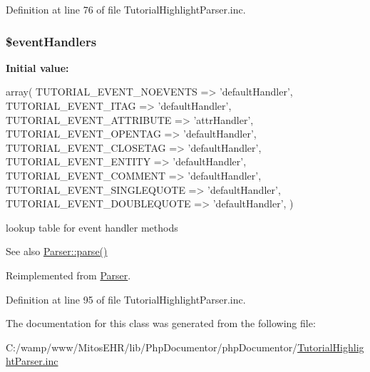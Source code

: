 \-Definition at line 76 of file \-Tutorial\-Highlight\-Parser.\-inc.

\hypertarget{classphp_documentor___tutorial_highlight_parser_a430675102684e9ab820c7622678832b0}{
\subsubsection[{\$event\-Handlers}]{\setlength{\rightskip}{0pt plus 5cm}\$event\-Handlers}}\label{classphp_documentor___tutorial_highlight_parser_a430675102684e9ab820c7622678832b0}
{\bfseries \-Initial value\-:}
\begin{DoxyCode}
 array(
        TUTORIAL_EVENT_NOEVENTS    => 'defaultHandler',
        TUTORIAL_EVENT_ITAG        => 'defaultHandler',
        TUTORIAL_EVENT_ATTRIBUTE   => 'attrHandler',
        TUTORIAL_EVENT_OPENTAG     => 'defaultHandler',
        TUTORIAL_EVENT_CLOSETAG    => 'defaultHandler',
        TUTORIAL_EVENT_ENTITY      => 'defaultHandler',
        TUTORIAL_EVENT_COMMENT     => 'defaultHandler',
        TUTORIAL_EVENT_SINGLEQUOTE => 'defaultHandler',
        TUTORIAL_EVENT_DOUBLEQUOTE => 'defaultHandler',
    )
\end{DoxyCode}
lookup table for event handler methods \begin{DoxySeeAlso}{\-See also}
\hyperlink{class_parser_a20139dbf0050f44b70e34bf32d89d7e4}{\-Parser\-::parse()} 
\end{DoxySeeAlso}


\-Reimplemented from \hyperlink{class_parser_a430675102684e9ab820c7622678832b0}{\-Parser}.



\-Definition at line 95 of file \-Tutorial\-Highlight\-Parser.\-inc.



\-The documentation for this class was generated from the following file\-:\begin{DoxyCompactItemize}
\item 
\-C\-:/wamp/www/\-Mitos\-E\-H\-R/lib/\-Php\-Documentor/php\-Documentor/\hyperlink{_tutorial_highlight_parser_8inc}{\-Tutorial\-Highlight\-Parser.\-inc}\end{DoxyCompactItemize}
